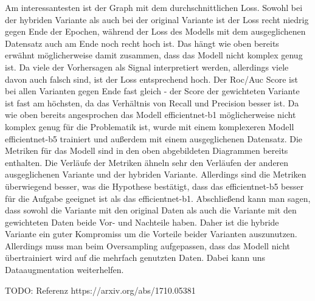 \documentclass[12pt, a4paper]{article}
\begin{document}
Am interessantesten ist der Graph mit dem durchschnittlichen Loss. Sowohl bei der hybriden Variante als auch bei der original Variante ist der Loss recht niedrig gegen Ende der Epochen, während der Loss des Modells mit dem ausgeglichenen Datensatz auch am Ende noch recht hoch ist. Das hängt wie oben bereits erwähnt möglicherweise damit zusammen, dass das Modell nicht komplex genug ist. Da viele der Vorhersagen als Signal interpretiert werden, allerdings viele davon auch falsch sind, ist der Loss entsprechend hoch. Der Roc/Auc Score ist bei allen Varianten gegen Ende fast gleich - der Score der gewichteten Variante ist fast am höchsten, da das Verhältnis von Recall und Precision besser ist. Da wie oben bereits angesprochen das Modell efficientnet-b1 möglicherweise nicht komplex genug für die Problematik ist, wurde mit einem komplexeren Modell efficientnet-b5 trainiert und außerdem mit einem ausgeglichenen Datensatz. Die Metriken für das Modell sind in den oben abgebildeten Diagrammen bereits enthalten. Die Verläufe der Metriken ähneln sehr den Verläufen der anderen ausgeglichenen Variante und der hybriden Variante. Allerdings sind die Metriken überwiegend besser, was die Hypothese bestätigt, dass das efficientnet-b5 besser für die Aufgabe geeignet ist als das efficientnet-b1.
\newline
Abschließend kann man sagen, dass sowohl die Variante mit den original Daten als auch die Variante mit den gewichteten Daten beide Vor- und Nachteile haben. Daher ist die hybride Variante ein guter Kompromiss um die Vorteile beider Varianten auszunutzen. Allerdings muss man beim Oversampling aufgepassen, dass das Modell nicht übertrainiert wird auf die mehrfach genutzten Daten. Dabei kann uns Dataaugmentation weiterhelfen.

TODO: Referenz https://arxiv.org/abs/1710.05381
\end{document}
